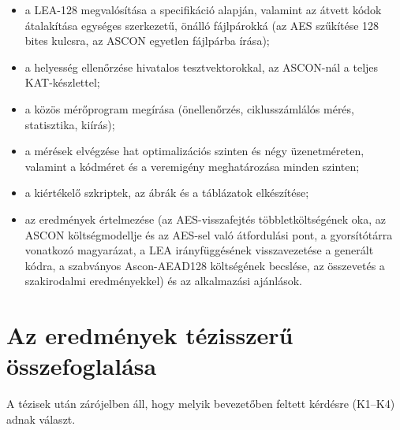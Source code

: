 \documentclass[a4paper,12pt]{report}
\theoremstyle{definition}
\theoremstyle{remark}
\begin{document}
\begin{itemize}
	\item a LEA-128 megvalósítása a specifikáció alapján, valamint az átvett kódok átalakítása egységes szerkezetű, önálló fájlpárokká (az AES szűkítése 128 bites kulcsra, az ASCON egyetlen fájlpárba írása);
	\item a helyesség ellenőrzése hivatalos tesztvektorokkal, az ASCON-nál a teljes KAT-készlettel;
	\item a közös mérőprogram megírása (önellenőrzés, ciklusszámlálós mérés, statisztika, kiírás);
	\item a mérések elvégzése hat optimalizációs szinten és négy üzenetméreten, valamint a kódméret és a veremigény meghatározása minden szinten;
	\item a kiértékelő szkriptek, az ábrák és a táblázatok elkészítése;
	\item az eredmények értelmezése (az AES-visszafejtés többletköltségének oka, az ASCON költségmodellje és az AES-sel való átfordulási pont, a gyorsítótárra vonatkozó magyarázat, a LEA irányfüggésének visszavezetése a generált kódra, a szabványos Ascon-AEAD128 költségének becslése, az összevetés a szakirodalmi eredményekkel) és az alkalmazási ajánlások.
\end{itemize}

\section{Az eredmények tézisszerű összefoglalása}\label{sec:tezisek}

A tézisek után zárójelben áll, hogy melyik bevezetőben feltett kérdésre (K1--K4) adnak választ.
\end{document}
